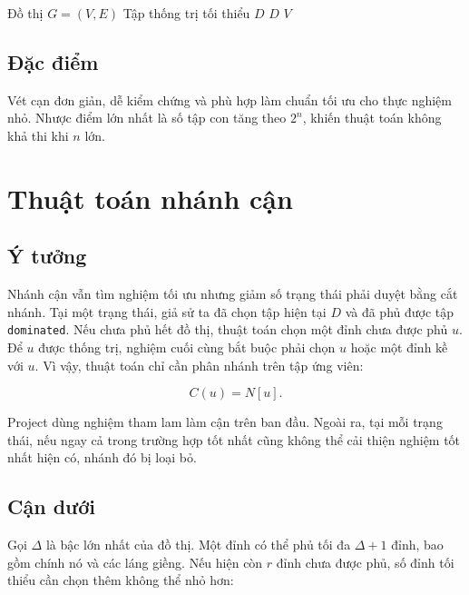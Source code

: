 \documentclass[12pt, a4paper]{report}
\newcommand{\MDS}{\textsc{Minimum Dominating Set}}
\begin{document}
\begin{algorithm}[H]
\caption{Vét cạn cho bài toán \MDS{}}
\begin{algorithmic}[1]
\Require Đồ thị $G=(V,E)$
\Ensure Tập thống trị tối thiểu $D$
      \State \Return $D$
    \EndIf
  \EndFor
\EndFor
\State \Return $V$
\end{algorithmic}
\end{algorithm}

\subsection{Đặc điểm}

Vét cạn đơn giản, dễ kiểm chứng và phù hợp làm chuẩn tối ưu cho thực nghiệm nhỏ. Nhược điểm lớn nhất
là số tập con tăng theo $2^n$, khiến thuật toán không khả thi khi $n$ lớn.

\section{Thuật toán nhánh cận}

\subsection{Ý tưởng}

Nhánh cận vẫn tìm nghiệm tối ưu nhưng giảm số trạng thái phải duyệt bằng cắt nhánh. Tại một trạng thái,
giả sử ta đã chọn tập hiện tại $D$ và đã phủ được tập \texttt{dominated}. Nếu chưa phủ hết đồ thị, thuật
toán chọn một đỉnh chưa được phủ $u$. Để $u$ được thống trị, nghiệm cuối cùng bắt buộc phải chọn $u$
hoặc một đỉnh kề với $u$. Vì vậy, thuật toán chỉ cần phân nhánh trên tập ứng viên:

\begin{equation}
  C(u)=N[u].
\end{equation}

Project dùng nghiệm tham lam làm cận trên ban đầu. Ngoài ra, tại mỗi trạng thái, nếu ngay cả trong trường
hợp tốt nhất cũng không thể cải thiện nghiệm tốt nhất hiện có, nhánh đó bị loại bỏ.

\subsection{Cận dưới}

Gọi $\Delta$ là bậc lớn nhất của đồ thị. Một đỉnh có thể phủ tối đa $\Delta+1$ đỉnh, bao gồm chính nó
và các láng giềng. Nếu hiện còn $r$ đỉnh chưa được phủ, số đỉnh tối thiểu cần chọn thêm không thể nhỏ hơn:
\end{document}
